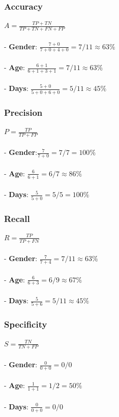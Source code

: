 \begin{multicols}{2}
\subsubsection{Accuracy}
$ A = \frac{TP+TN}{TP+TN+FN+FP} $
\\\\
- \textbf{Gender}: $\frac{7+0}{7+0+4+0} = 7/11 \approx 63\%$\\\\
- \textbf{Age}: $\frac{6+1}{6+1+3+1} = 7/11 \approx 63\%$\\\\
- \textbf{Days}: $\frac{5+0}{5+0+6+0} = 5/11 \approx 45\%$\\

\subsubsection{Precision}
$ P = \frac{TP}{TP+FP} $
\\\\
- \textbf{Gender}:$ \frac{7}{7+0} = 7/7 = 100\%$\\\\
- \textbf{Age}: $\frac{6}{6+1} = 6/7 \approx 86\%$\\\\
- \textbf{Days}: $\frac{5}{5+0} = 5/5 = 100\%$\\

\subsubsection{Recall}
$ R = \frac{TP}{TP+FN} $
\\\\
- \textbf{Gender}: $\frac{7}{7+4} = 7/11 \approx 63\%$\\\\
- \textbf{Age}: $\frac{6}{6+3} = 6/9 \approx 67\%$\\\\
- \textbf{Days}: $\frac{5}{5+6} = 5/11 \approx 45\%$

\subsubsection{Specificity}
$ S = \frac{TN}{TN+FP} $
\\\\
- \textbf{Gender}: $\frac{0}{0+0} = 0/0$\\\\
- \textbf{Age}: $\frac{1}{1+1} = 1/2 = 50\%$\\\\
- \textbf{Days}: $\frac{0}{0+0} = 0/0$\\

\end{multicols}

